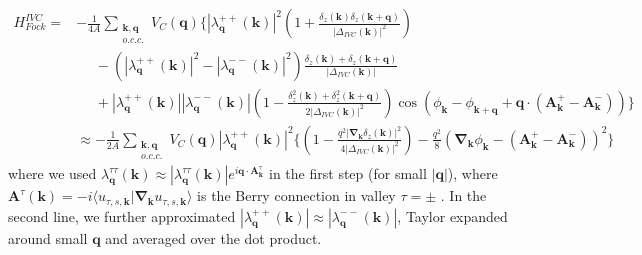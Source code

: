 \documentclass[aps,pra,twocolumn,superscriptaddress,10pt,article,nofootinbib,showpacs,longbibliography]{revtex4-1}
\def \k{{\mathbf k}}
\def \q{{\mathbf q}}
\def \A{{\mathbf A}}
\begin{document}
\begin{align}
    H_{Fock}^{IVC} = &-\frac{1}{4 A} \sum_{\substack{\mathbf{k}, \mathbf{q}\\o.c.c.}} V_C(\boldsymbol{q}) \bigg \{ |\lambda^{++}_{\boldsymbol{q}}(\boldsymbol{k})|^2 \left ( 1 + \frac{ \delta_z(\k) \delta_z(\k+\q)}{\left | \Delta_{IVC}(\k) \right |^2} \right ) \nonumber\\
    &\phantom{=} - \left ( |\lambda^{++}_{\boldsymbol{q}}(\boldsymbol{k})|^2 - |\lambda^{--}_{\boldsymbol{q}}(\boldsymbol{k})|^2\right ) \frac{ \delta_z(\k)+ \delta_z(\k+\q)}{\left | \Delta_{IVC}(\k) \right |} \nonumber \\
    & \phantom{=} + |\lambda^{++}_{\boldsymbol{q}}(\boldsymbol{k})| |\lambda^{--}_{\boldsymbol{q}}(\boldsymbol{k})| \left ( 1 - \frac{ \delta_z^2(\k) + \delta_z^2(\k+\q)}{2\left | \Delta_{IVC}(\k) \right |^2} \right ) \cos \left(\phi_{\boldsymbol{k}}-\phi_{\boldsymbol{k}+\boldsymbol{q}}+\boldsymbol{q} \cdot\left(\boldsymbol{A}^+_{\boldsymbol{k}}-\boldsymbol{A}^-_{\boldsymbol{k}}\right)\right) \bigg \}\\
    &\approx -\frac{1}{2 A} \sum_{\substack{\mathbf{k}, \mathbf{q}\\o.c.c.}} V_C(\boldsymbol{q}) |\lambda^{++}_{\boldsymbol{q}}(\boldsymbol{k})|^2 \Bigg \{ \left ( 1 - \frac{ q^2 \left | \boldsymbol{\nabla}_{\boldsymbol{k}} \delta_z(\k) \right |^2 }{4\left | \Delta_{IVC}(\k) \right |^2} \right ) - \frac{q^2}8 \left(\boldsymbol{\nabla}_{\boldsymbol{k}} \phi_{\boldsymbol{k}}-\left(\boldsymbol{A}^+_{\boldsymbol{k}}-\boldsymbol{A}^-_{\boldsymbol{k}}\right)\right)^{2} \Bigg \}
\end{align}
where we used $\lambda^{\tau \tau}_{\boldsymbol{q}}(\boldsymbol{k}) \approx |\lambda^{\tau \tau}_{\boldsymbol{q}}(\boldsymbol{k})| e^{i \boldsymbol{q} \cdot \boldsymbol{A}^\tau_{\boldsymbol{k}}}$ in the first step (for small $|\q|$), where $\A^\tau(\k) = - i \langle u_{\tau,s,\k} | \mathbf{\nabla}_\k u_{\tau,s,\k} \rangle$ is the Berry connection in valley $\tau = \pm$ \cite{Khalaf2020}. In the second line, we further approximated $|\lambda^{++}_{\boldsymbol{q}}(\boldsymbol{k})| \approx |\lambda^{--}_{\boldsymbol{q}}(\boldsymbol{k})|$, Taylor expanded around small $\mathbf{q}$ and averaged over the dot product.
\end{document}
